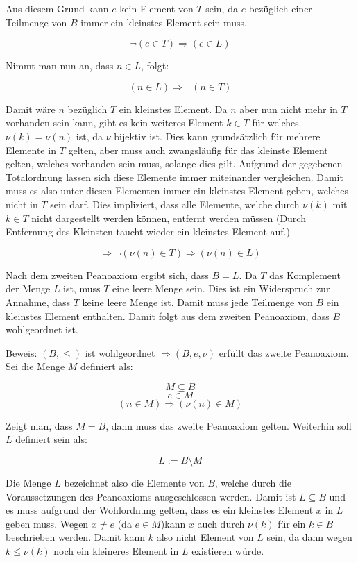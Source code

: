\documentclass[11pt, a4paper]{article}
\begin{document}
		Aus diesem Grund kann $e$ kein Element von $T$ sein, da $e$ bezüglich einer Teilmenge von $B$ immer ein kleinstes Element sein muss.

		\[ \neg(e \in T) \Rightarrow (e \in L) \]

		Nimmt man nun an, dass $n \in L$, folgt:

		\[ (n \in L) \Rightarrow \neg(n \in T) \]

		Damit wäre $n$ bezüglich $T$ ein kleinstes Element. Da $n$ aber nun nicht mehr in $T$ vorhanden sein kann, gibt es kein weiteres Element $k \in T$ für welches $\nu(k) = \nu(n)$ ist, da $\nu$ bijektiv ist. Dies kann grundsätzlich für mehrere Elemente in $T$ gelten, aber muss auch zwangsläufig für das kleinste Element gelten, welches vorhanden sein muss, solange dies gilt. Aufgrund der gegebenen Totalordnung lassen sich diese Elemente immer miteinander vergleichen.
		Damit muss es also unter diesen Elementen immer ein kleinstes Element geben, welches nicht in $T$ sein darf. Dies impliziert, dass alle Elemente, welche durch $\nu(k)$ mit $k \in T$ nicht dargestellt werden können, entfernt werden müssen (Durch Entfernung des Kleinsten taucht wieder ein kleinstes Element auf.)

		\[ \Rightarrow \neg(\nu(n) \in T) \Rightarrow (\nu(n) \in L) \] 

		Nach dem zweiten Peanoaxiom ergibt sich, dass $B = L$. Da $T$ das Komplement der Menge $L$ ist, muss $T$ eine leere Menge sein. Dies ist ein Widerspruch zur Annahme, dass $T$ keine leere Menge ist. Damit muss jede Teilmenge von $B$ ein kleinstes Element enthalten. Damit folgt aus dem zweiten Peanoaxiom, dass $B$ wohlgeordnet ist. \\

		\newpage

		Beweis: $(B,\leq)$ ist wohlgeordnet $\Rightarrow (B,e,\nu)$ erfüllt das zweite Peanoaxiom. \\

		Sei die Menge $M$ definiert als:

		\[ M \subseteq B \]
		\[ e \in M \]
		\[ (n \in M) \Rightarrow (\nu(n) \in M) \]

		Zeigt man, dass $M=B$, dann muss das zweite Peanoaxiom gelten. Weiterhin soll $L$ definiert sein als:

		\[ L := B\setminus M \]

		Die Menge $L$ bezeichnet also die Elemente von $B$, welche durch die Voraussetzungen des Peanoaxioms ausgeschlossen werden. Damit ist $L \subseteq B$ und es muss aufgrund der Wohlordnung gelten, dass es ein kleinstes Element $x$ in $L$ geben muss. Wegen $x \neq e$ (da $e \in M$)kann $x$ auch durch $\nu(k)$ für ein $k \in B$ beschrieben werden. Damit kann $k$ also nicht Element von $L$ sein, da dann wegen $k \leq \nu(k)$ noch ein kleineres Element in $L$ existieren würde.
\end{document}
